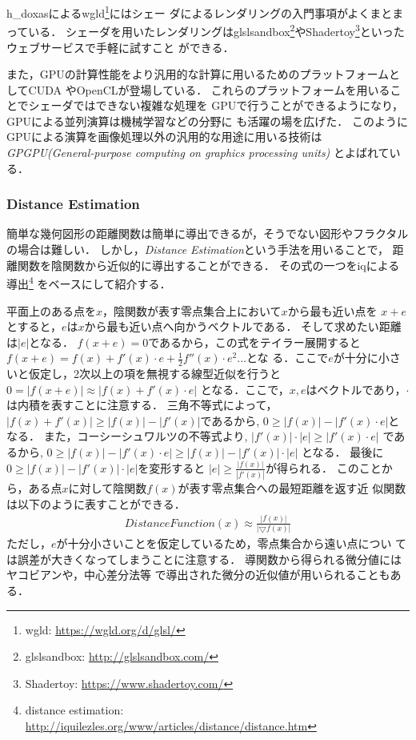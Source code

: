 h\_doxasによるwgld\footnote{wgld: \url{https://wgld.org/d/glsl/}}にはシェー
ダによるレンダリングの入門事項がよくまとまっている．
シェーダを用いたレンダリングはglslsandbox\footnote{glslsandbox:
\url{http://glslsandbox.com/}}やShadertoy\footnote{Shadertoy:
\url{https://www.shadertoy.com/}}といったウェブサービスで手軽に試すこと
ができる．

また，GPUの計算性能をより汎用的な計算に用いるためのプラットフォームとしてCUDA
やOpenCLが登場している．
これらのプラットフォームを用いることでシェーダではできない複雑な処理を
GPUで行うことができるようになり，GPUによる並列演算は機械学習などの分野に
も活躍の場を広げた．
このようにGPUによる演算を画像処理以外の汎用的な用途に用いる技術は
\textit{GPGPU(General-purpose computing on graphics processing units)}
とよばれている．

\subsubsection{Distance Estimation}

簡単な幾何図形の距離関数は簡単に導出できるが，そうでない図形やフラクタル
の場合は難しい．
しかし，\textit{Distance Estimation}という手法を用いることで，
距離関数を陰関数から近似的に導出することができる．
その式の一つをiqによる導出\footnote{distance estimation:
\url{http://iquilezles.org/www/articles/distance/distance.htm}}
をベースにして紹介する．

平面上のある点を$x$，陰関数が表す零点集合上において$x$から最も近い点を
$x + e$とすると，$e$は$x$から最も近い点へ向かうベクトルである．
そして求めたい距離は$|e|$となる．
$f(x + e) = 0$であるから，この式をテイラー展開すると
$f(x + e) = f(x) + f'(x) \cdot e  + \frac{1}{2}f''(x) \cdot e^2 ...$とな
る．ここで$e$が十分に小さいと仮定し，2次以上の項を無視する線型近似を行うと
$0=|f(x + e)| \approx |f(x) + f'(x) \cdot e|$
となる．ここで，$x, e$はベクトルであり，$\cdot$は内積を表すことに注意する．
三角不等式によって，$| f(x) + f'(x) | \geq |f(x)| - |f'(x)|$であるから,
$0 \geq |f(x)| - |f'(x) \cdot e|$となる．
また，コーシーシュワルツの不等式より,
$|f'(x)| \cdot |e| \geq | f'(x)\cdot e|$
であるから,
$0 \geq |f(x)| - |f'(x) \cdot e| \geq |f(x)| - |f'(x)| \cdot |e|$
となる．
最後に$0 \geq |f(x)| - |f'(x)| \cdot |e|$を変形すると
$|e| \geq \frac{|f(x)|}{|f'(x)|}$が得られる．
このことから，ある点$x$に対して陰関数$f(x)$が表す零点集合への最短距離を返す近
似関数は以下のように表すことができる．
\begin{align*}
 DistanceFunction(x) \approx \frac{|f(x)|}{|\bigtriangledown f(x)|}
\end{align*}
ただし，$e$が十分小さいことを仮定しているため，零点集合から遠い点につい
ては誤差が大きくなってしまうことに注意する．
導関数から得られる微分値にはヤコビアンや，中心差分法等
で導出された微分の近似値が用いられることもある．

